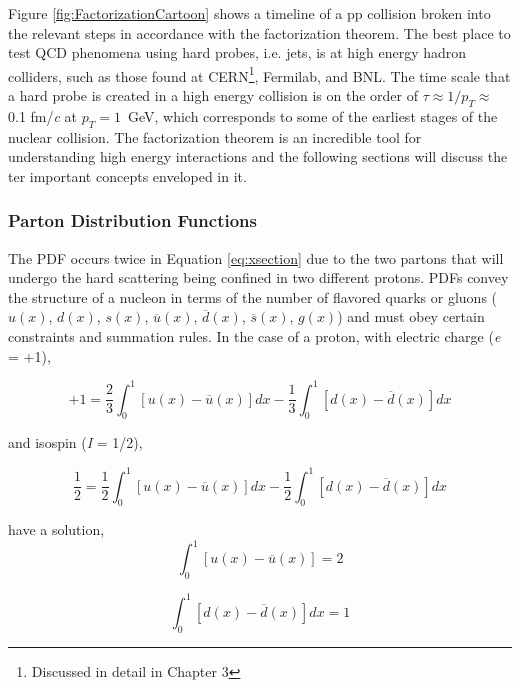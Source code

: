 \noindent
Figure \ref{fig:FactorizationCartoon} shows a timeline of a pp collision broken into the relevant steps in accordance with the factorization theorem.  The best place to test QCD phenomena using hard probes, i.e. jets, is at high energy hadron colliders, such as those found at CERN\footnote{Discussed in detail in Chapter 3}, Fermilab, and BNL. The time scale that a hard probe is created in a high energy collision is on the order of $\tau \approx 1/p_{T} \approx$ \, 0.1 fm/\textit{c} at $p_{T} = 1 \,$ GeV, which corresponds to some of the earliest stages of the nuclear collision.  The factorization theorem is an incredible tool for understanding high energy interactions and the following sections will discuss the ter important concepts enveloped in it.

\subsubsection{Parton Distribution Functions}
The PDF occurs twice in Equation \ref{eq:xsection} due to the two partons that will undergo the hard scattering being confined in two different protons.  PDFs convey the structure of a nucleon in terms of the number of flavored quarks or gluons ($u(x)$, $d(x)$, $s(x)$, $\overline{u}(x)$, $\overline{d}(x)$, $\overline{s}(x)$, $g(x)$) and must obey certain constraints and summation rules.  In the case of a proton, with electric charge (\textit{e} = +1),

\begin{equation}
+1 = \frac{2}{3} \int_{0}^{1} [u(x) - \overline{u}(x)] dx - \frac{1}{3} \int^{1}_{0} [d(x) - \overline{d}(x)] dx
\label{eq:PDFcharge}
\end{equation}

\noindent
and isospin (\textit{I} = 1/2),

\begin{equation}
\frac{1}{2} = \frac{1}{2} \int_{0}^{1} [u(x) - \overline{u}(x)] dx - \frac{1}{2} \int^{1}_{0} [d(x) - \overline{d}(x)] dx
\label{eq:PDFIso}
\end{equation}

\noindent
have a solution,
\begin{equation}
 \int_{0}^{1} [u(x) - \overline{u}(x)] = 2
\label{eq:PDFSouU}
\end{equation}

\begin{equation}
\int^{1}_{0} [d(x) - \overline{d}(x)] dx = 1
\label{eq:PDFSouD}
\end{equation}

